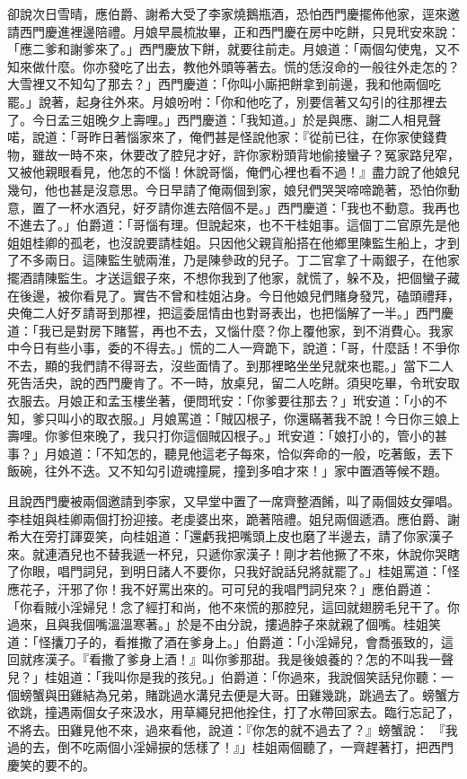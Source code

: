 卻說次日雪晴，應伯爵、謝希大受了李家燒鵝瓶酒，恐怕西門慶擺佈他家，逕來邀請西門慶進裡邊陪禮。月娘早晨梳妝畢，正和西門慶在房中吃餅，只見玳安來說： 「應二爹和謝爹來了。」西門慶放下餅，就要往前走。月娘道：「兩個勾使鬼，又不知來做什麼。你亦發吃了出去，教他外頭等著去。慌的恁沒命的一般往外走怎的？大雪裡又不知勾了那去？」西門慶道：「你叫小廝把餅拿到前邊，我和他兩個吃罷。」說著，起身往外來。月娘吩咐：「你和他吃了，別要信著又勾引的往那裡去了。今日孟三姐晚夕上壽哩。」西門慶道：「我知道。」於是與應、謝二人相見聲喏，說道：「哥昨日著惱家來了，俺們甚是怪說他家：『從前已往，在你家使錢費物，雖故一時不來，休要改了腔兒才好，許你家粉頭背地偷接蠻子？冤家路兒窄，又被他親眼看見，他怎的不惱！休說哥惱，俺們心裡也看不過！』盡力說了他娘兒幾句，他也甚是沒意思。今日早請了俺兩個到家，娘兒們哭哭啼啼跪著，恐怕你動意，置了一杯水酒兒，好歹請你進去陪個不是。」西門慶道：「我也不動意。我再也不進去了。」伯爵道：「哥惱有理。但說起來，也不干桂姐事。這個丁二官原先是他姐姐桂卿的孤老，也沒說要請桂姐。只因他父親貨船搭在他鄉里陳監生船上，才到了不多兩日。這陳監生號兩淮，乃是陳參政的兒子。丁二官拿了十兩銀子，在他家擺酒請陳監生。才送這銀子來，不想你我到了他家，就慌了，躲不及，把個蠻子藏在後邊，被你看見了。實告不曾和桂姐沾身。今日他娘兒們賭身發咒，磕頭禮拜，央俺二人好歹請哥到那裡，把這委屈情由也對哥表出，也把惱解了一半。」西門慶道：「我已是對房下賭誓，再也不去，又惱什麼？你上覆他家，到不消費心。我家中今日有些小事，委的不得去。」慌的二人一齊跪下，說道：「哥，什麼話！不爭你不去，顯的我們請不得哥去，沒些面情了。到那裡略坐坐兒就來也罷。」當下二人死告活央，說的西門慶肯了。不一時，放桌兒，留二人吃餅。須臾吃畢，令玳安取衣服去。月娘正和孟玉樓坐著，便問玳安：「你爹要往那去？」玳安道：「小的不知，爹只叫小的取衣服。」月娘罵道：「賊囚根子，你還瞞著我不說！今日你三娘上壽哩。你爹但來晚了，我只打你這個賊囚根子。」玳安道：「娘打小的，管小的甚事？」月娘道：「不知怎的，聽見他這老子每來，恰似奔命的一般，吃著飯，丟下飯碗，往外不迭。又不知勾引遊魂撞屍，撞到多咱才來！」家中置酒等候不題。

且說西門慶被兩個邀請到李家，又早堂中置了一席齊整酒餚，叫了兩個妓女彈唱。李桂姐與桂卿兩個打扮迎接。老虔婆出來，跪著陪禮。姐兒兩個遞酒。應伯爵、謝希大在旁打諢耍笑，向桂姐道：「還虧我把嘴頭上皮也磨了半邊去，請了你家漢子來。就連酒兒也不替我遞一杯兒，只遞你家漢子！剛才若他撅了不來，休說你哭瞎了你眼，唱門詞兒，到明日諸人不要你，只我好說話兒將就罷了。」桂姐罵道：「怪應花子，汗邪了你！我不好罵出來的。可可兒的我唱門詞兒來？」應伯爵道： 「你看賊小淫婦兒！念了經打和尚，他不來慌的那腔兒，這回就翅膀毛兒干了。你過來，且與我個嘴溫溫寒著。」於是不由分說，摟過脖子來就親了個嘴。桂姐笑道：「怪攮刀子的，看推撒了酒在爹身上。」伯爵道：「小淫婦兒，會喬張致的，這回就疼漢子。『看撒了爹身上酒！』叫你爹那甜。我是後娘養的？怎的不叫我一聲兒？」桂姐道：「我叫你是我的孩兒。」伯爵道：「你過來，我說個笑話兒你聽：一個螃蟹與田雞結為兄弟，賭跳過水溝兒去便是大哥。田雞幾跳，跳過去了。螃蟹方欲跳，撞遇兩個女子來汲水，用草繩兒把他拴住，打了水帶回家去。臨行忘記了，不將去。田雞見他不來，過來看他，說道：『你怎的就不過去了？』螃蟹說： 『我過的去，倒不吃兩個小淫婦捩的恁樣了！』」桂姐兩個聽了，一齊趕著打，把西門慶笑的要不的。

